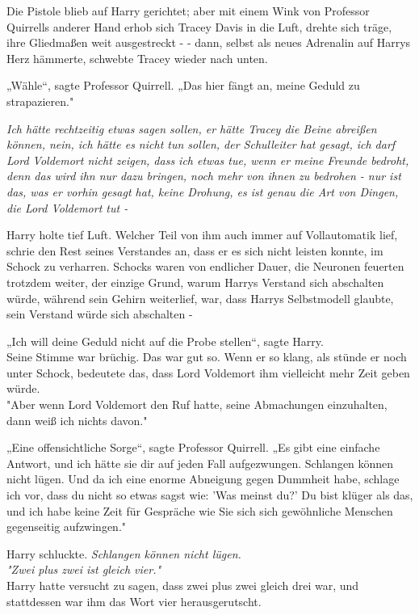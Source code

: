 {Die Pistole blieb auf Harry gerichtet; aber mit einem Wink von Professor Quirrells anderer Hand erhob sich Tracey Davis in die Luft, drehte sich träge, ihre Gliedmaßen weit ausgestreckt - - dann, selbst als neues Adrenalin auf Harrys Herz hämmerte, schwebte Tracey wieder nach unten.

„Wähle“, sagte Professor Quirrell. „Das hier fängt an, meine Geduld zu strapazieren."

\emph{Ich hätte rechtzeitig etwas sagen sollen, er hätte Tracey die Beine abreißen können, nein, ich hätte es nicht tun sollen, der Schulleiter hat gesagt, ich darf Lord Voldemort nicht zeigen, dass ich etwas tue, wenn er meine Freunde bedroht, denn das wird ihn nur dazu bringen, noch mehr von ihnen zu bedrohen - nur ist das, was er vorhin gesagt hat, keine Drohung, es ist genau die Art von Dingen, die Lord Voldemort tut -}

Harry holte tief Luft. Welcher Teil von ihm auch immer auf Vollautomatik lief, schrie den Rest seines Verstandes an, dass er es sich nicht leisten konnte, im Schock zu verharren. Schocks waren von endlicher Dauer, die Neuronen feuerten trotzdem weiter, der einzige Grund, warum Harrys Verstand sich abschalten würde, während sein Gehirn weiterlief, war, dass Harrys Selbstmodell glaubte, sein Verstand würde sich abschalten -

„Ich will deine Geduld nicht auf die Probe stellen“, sagte Harry.\\ Seine Stimme war brüchig. Das war gut so. Wenn er so klang, als stünde er noch unter Schock, bedeutete das, dass Lord Voldemort ihm vielleicht mehr Zeit geben würde.\\ "Aber wenn Lord Voldemort den Ruf hatte, seine Abmachungen einzuhalten, dann weiß ich nichts davon."

„Eine offensichtliche Sorge“, sagte Professor Quirrell. „Es gibt eine einfache Antwort, und ich hätte sie dir auf jeden Fall aufgezwungen. Schlangen können nicht lügen. Und da ich eine enorme Abneigung gegen Dummheit habe, schlage ich vor, dass du nicht so etwas sagst wie: 'Was meinst du?' Du bist klüger als das, und ich habe keine Zeit für Gespräche wie Sie sich sich gewöhnliche Menschen gegenseitig aufzwingen."

Harry schluckte. \emph{Schlangen können nicht lügen.}\\ \emph{"Zwei plus zwei ist gleich vier."}\\ Harry hatte versucht zu sagen, dass zwei plus zwei gleich drei war, und stattdessen war ihm das Wort vier herausgerutscht.

}
